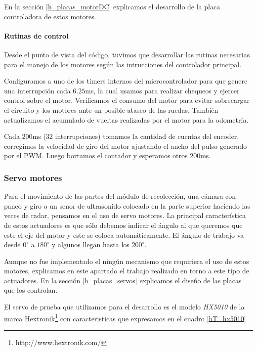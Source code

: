 En la secci\'on \ref{h_placas_motorDC} explicamos el desarrollo de la placa controladora de estos motores.

\paragraph{Rutinas de control}
\label{h_actuadores_motorDC_rutinas}

Desde el punto de vista del c\'odigo, tuvimos que desarrollar las rutinas necesarias para el manejo de los motores seg\'un las intrucciones del
controlador principal.

Configuramos a uno de los timers internos del microcontrolador para que genere una interrupci\'on cada $6.25$ms, la cual usamos para realizar
chequeos y ejercer control sobre el motor.
Verificamos el consumo del motor para evitar sobrecargar el circuito y los motores ante un posible atasco de las ruedas.
Tambi\'en actualizamos el acumulado de vueltas realizadas por el motor para la odometr\'ia.

Cada $200$ms ($32$ interrupciones) tomamos la cantidad de cuentas del encoder, corregimos la velocidad de giro del motor ajustando el
ancho del pulso generado por el PWM.
Luego borramos el contador y esperamos otros $200$ms.

\subsubsection{Servo motores}
\label{h_actuadores_servo}

Para el movimiento de las partes del m\'odulo de recolecci\'on, una c\'amara con paneo y giro o un senor de ultrasonido colocado
en la parte superior haciendo las veces de radar, pensamos en el uso de servo motores.
La principal caracter\'istica de estos actuadores es que s\'olo debemos indicar el \'angulo al que queremos que este
el eje del motor y este se coloca autom\'aticamente.
El \'angulo de trabajo va desde $0^{\circ}$ a $180^{\circ}$ y algunos llegan hasta los $200^{\circ}$.

Aunque no fue implementado el ning\'un mecanismo que requiriera el uso de estos motores, explicamos en este apartado el trabajo realizado
en torno a este tipo de actuadores.
En la secci\'on \ref{h_placas_servos} explicamos el dise\~no de las placas que los controlan.

El servo de prueba que utilizamos para el desarrollo es el modelo \emph{HX5010} de la marca Hextronik\footnote{http://www.hextronik.com/}
con caracteristicas que expresamos en el cuadro \ref{hT_hx5010}

